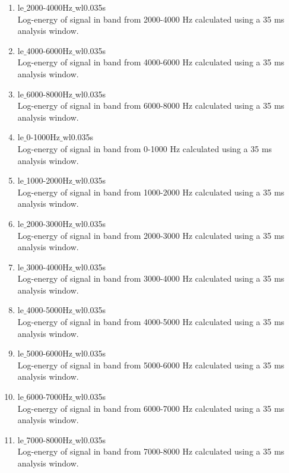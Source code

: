 \documentclass[12pt]{article}
\begin{document}
\begin{enumerate}
    \item le$\_$2000-4000Hz$\_$wl0.035s \\
      Log-energy of signal in band from 2000-4000 Hz calculated using a 35 ms analysis window.

    \item le$\_$4000-6000Hz$\_$wl0.035s \\
      Log-energy of signal in band from 4000-6000 Hz calculated using a 35 ms analysis window.

    \item le$\_$6000-8000Hz$\_$wl0.035s \\
      Log-energy of signal in band from 6000-8000 Hz calculated using a 35 ms analysis window.

    \item le$\_$0-1000Hz$\_$wl0.035s \\
      Log-energy of signal in band from 0-1000 Hz calculated using a 35 ms analysis window.

    \item le$\_$1000-2000Hz$\_$wl0.035s \\
      Log-energy of signal in band from 1000-2000 Hz calculated using a 35 ms analysis window.

    \item le$\_$2000-3000Hz$\_$wl0.035s \\
      Log-energy of signal in band from 2000-3000 Hz calculated using a 35 ms analysis window.

    \item le$\_$3000-4000Hz$\_$wl0.035s \\
      Log-energy of signal in band from 3000-4000 Hz calculated using a 35 ms analysis window.

    \item le$\_$4000-5000Hz$\_$wl0.035s \\
      Log-energy of signal in band from 4000-5000 Hz calculated using a 35 ms analysis window.

    \item le$\_$5000-6000Hz$\_$wl0.035s \\
      Log-energy of signal in band from 5000-6000 Hz calculated using a 35 ms analysis window.

    \item le$\_$6000-7000Hz$\_$wl0.035s \\
      Log-energy of signal in band from 6000-7000 Hz calculated using a 35 ms analysis window.

    \item le$\_$7000-8000Hz$\_$wl0.035s \\
      Log-energy of signal in band from 7000-8000 Hz calculated using a 35 ms analysis window.


\end{enumerate}
\end{document}
